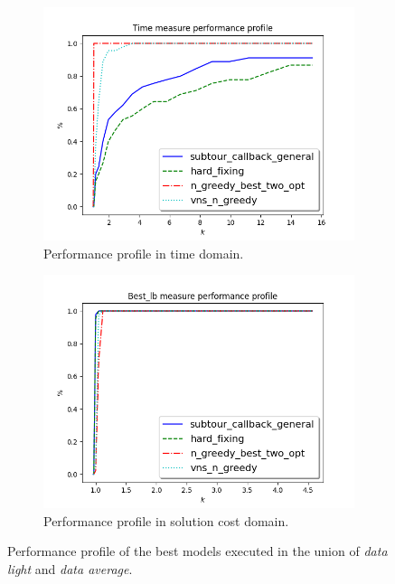 \begin{figure}[!h]
	\centering
	\begin{subfigure}{.49\textwidth}
		\centering
		\includegraphics[width=\columnwidth]{../res/Lbest_time.png}
		\caption{Performance profile in time domain.}
		\label{fig:Lbest_time}
	\end{subfigure}
\hfill
	\begin{subfigure}{.49\textwidth}
		\centering
		\includegraphics[width=\columnwidth]{../res/Lbest_lb.png}
		\caption{Performance profile in solution cost domain.}
		\label{fig:Lbest_lb}
	\end{subfigure}
	\caption{Performance profile of the best models executed in the union of \textit{data light} and \textit{data average}.}
	\label{fig:pp_Lbest}
\end{figure}